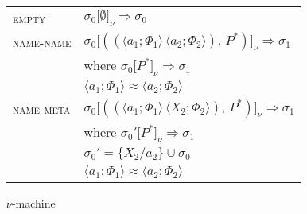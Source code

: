 \documentclass[a4paper,UKenglish]{lipics-v2016}
\newcommand{\clos}[2] {
  \langle #1; #2 \rangle
}
\newcommand{\aframe}[2] {
  \lbrack #1, #2 \rbrack_\alpha
}
\newcommand{\nuframe}[3] {
  #1 \lbrack #2 \rbrack_\nu\Rightarrow #3
}
\newcommand{\pr}[2] {
 (#1\, #2)
}
\newcommand{\bd}[2] {
 #1/ #2
}
\newcommand*{\transname}[1]{\textsc{#1}}
\begin{document}
\begin{wrapfigure}{r}{0.5\textwidth}
\begin{minipage}[b]{0.4\textwidth}
  \caption{$\nu$-machine}\label{machine:nu}
  \begin{tabular}{l l}
    \transname{empty} & $\nuframe{\sigma_0}{\emptyset}{\sigma_0}$ \\
    \transname{name-name} & $\nuframe{\sigma_0}{(\pr{\clos{a_1}{\Phi_1}}{\clos{a_2}{\Phi_2}},\,P^*)}{\sigma_1}$ \\
    & where $\nuframe{\sigma_0}{P^*}{\sigma_1}$ \\
    & \hspace{8mm} $\clos{a_1}{\Phi_1} \approx \clos{a_2}{\Phi_2}$ \\
    \transname{name-meta} & $\nuframe{\sigma_0}{(\pr{\clos{a_1}{\Phi_1}}{\clos{X_2}{\Phi_2}},\,P^*)}{\sigma_1}$ \\
    & where $\nuframe{\sigma_0'}{P^*}{\sigma_1}$ \\
    & \hspace{8mm} $\sigma_0' = \{\bd{X_2}{a_2}\} \cup \sigma_0$ \\
    & \hspace{8mm} $\clos{a_1}{\Phi_1} \approx \clos{a_2}{\Phi_2}$ \\
  \end{tabular}
  \end{minipage}
  

\end{wrapfigure}
\end{document}
